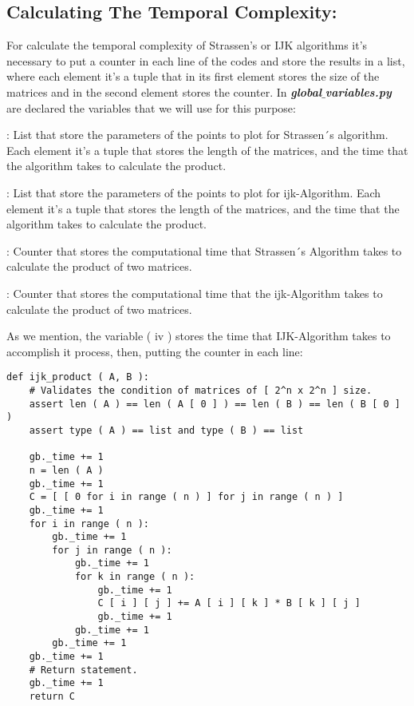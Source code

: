 \subsection{Calculating The Temporal Complexity:}

For calculate the temporal complexity of Strassen's or IJK algorithms it's necessary to put a counter in each line of the codes and store the results in a list, where each element it's a tuple that in its first element stores the size of the matrices and in the second element stores the counter. In {\bfseries\itshape global$\_$variables.py} are declared the variables that we will use for this purpose: \hfill

\begin{tasks}
: List that store the parameters of the points to plot for Strassen´s algorithm. Each element it's a tuple that stores the length of the matrices, and the time that the algorithm takes to calculate the product.

: List that store the parameters of the points to plot for ijk-Algorithm. Each element it's a tuple that stores the length of the matrices, and the time that the algorithm takes to calculate the product.

: Counter that stores the computational time that Strassen´s Algorithm takes to calculate the product of two matrices. 

: Counter that stores the computational time that the ijk-Algorithm takes to calculate the product of two matrices.
\end{tasks} \hfill

As we mention, the variable ( iv ) stores the time that IJK-Algorithm takes to accomplish it process, then, putting the counter in each line: \hfill \break

\begin{lstlisting}
def ijk_product ( A, B ):
    # Validates the condition of matrices of [ 2^n x 2^n ] size.
    assert len ( A ) == len ( A [ 0 ] ) == len ( B ) == len ( B [ 0 ] )
    assert type ( A ) == list and type ( B ) == list

    gb._time += 1
    n = len ( A )
    gb._time += 1
    C = [ [ 0 for i in range ( n ) ] for j in range ( n ) ]
    gb._time += 1
    for i in range ( n ):
        gb._time += 1
        for j in range ( n ):
            gb._time += 1
            for k in range ( n ):
                gb._time += 1
                C [ i ] [ j ] += A [ i ] [ k ] * B [ k ] [ j ]
                gb._time += 1
            gb._time += 1
        gb._time += 1
    gb._time += 1
    # Return statement.
    gb._time += 1
    return C
\end{lstlisting}

